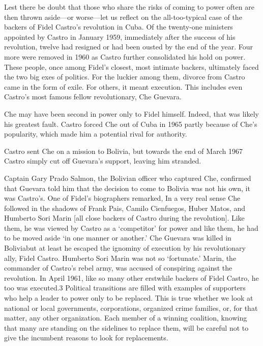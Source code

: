 \documentclass[10pt]{article}
\begin{document}
{\large Lest there be doubt that those who share the risks of coming to power
often are then thrown aside---or worse---let us reflect on the all-too-typical
case of the backers of Fidel Castro's revolution in Cuba. Of the twenty-one
ministers appointed by Castro in January 1959, immediately after the success of
his revolution, twelve had resigned or had been ousted by the end of the year.
Four more were removed in 1960 as Castro further consolidated his hold on power.
These people, once among Fidel's closest, most intimate backers, ultimately faced
the two big exes of politics. For the luckier among them, divorce from Castro
came in the form of exile. For others, it meant execution. This includes even
Castro's most famous fellow revolutionary, Che Guevara.}

{\large Che may have been second in power only to Fidel himself. Indeed, that
was likely his greatest fault. Castro forced Che out of Cuba in 1965 partly
because of Che's popularity, which made him a potential rival for authority.}

{\large Castro sent Che on a mission to Bolivia, but towards the end of March
1967 Castro simply cut off Guevara's support, leaving him stranded.}

{\large Captain Gary Prado Salmon, the Bolivian officer who captured Che,
confirmed that Guevara told him that the decision to come to Bolivia was not his
own, it was Castro's. One of Fidel's biographers remarked, In a very real sense
Che followed in the shadows of Frank Pais, Camilo Cienfuegos, Huber Matos, and
Humberto Sori Marin [all close backers of Castro during the revolution]. Like
them, he was viewed by Castro as a `competitor' for power and like them, he had
to be moved aside `in one manner or another.' Che Guevara was killed in
Boliviabut at least he escaped the ignominy of execution by his revolutionary
ally, Fidel Castro. Humberto Sori Marin was not so `fortunate.' Marin, the
commander of Castro's rebel army, was accused of conspiring against the
revolution. In April 1961, like so many other erstwhile backers of Fidel Castro,
he too was executed.3 Political transitions are filled with examples of
supporters who help a leader to power only to be replaced. This is true whether
we look at national or local governments, corporations, organized crime families,
or, for that matter, any other organization. Each member of a winning coalition,
knowing that many are standing on the sidelines to replace them, will be careful
not to give the incumbent reasons to look for replacements.}
\end{document}
